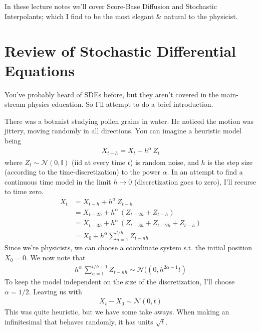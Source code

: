 \\
\\
In these lecture notes we'll cover Score-Base Diffusion and Stochastic Interpolants; which I find to be the most elegant \& natural to the physicist.



\section{Review of Stochastic Differential Equations}
You've probably heard of SDEs before, but they aren't covered in the main-stream physics education. So I'll attempt to do a brief introduction. 

There was a botanist studying pollen grains in water. He noticed the motion was jittery, moving randomly in all directions. You can imagine a heuristic model being
\begin{align}
	X_{t+h} = X_t + h^\alpha \, Z_t
\end{align}
where $Z_t \sim \mathcal N(0, \mathbb I)$ (iid at every time $t$) is random noise, and $h$ is the step size (according to the time-discretization) to the power $\alpha$. In an attempt to find a continuous time model in the limit $h \to 0$ (discretization goes to zero), I'll recurse to time zero.
\begin{align}
	X_{t} &= X_{t-h} + h^\alpha \, Z_{t-h}\\
	& = X_{t-2h} + h^\alpha \, (Z_{t-2h} + Z_{t-h})\\
	& = X_{t-3h} + h^\alpha \, (Z_{t-3h} + Z_{t-2h} + Z_{t-h})\\
	& = X_0 + h^\alpha \sum_{n=1}^{t/h } Z_{t - nh}
\end{align}
Since we're physicists, we can choose a coordinate system s.t. the initial position $X_0 = 0$. We now note that
\begin{align}
	h^\alpha \, \sum_{n=1}^{t/h  + 1} Z_{t - nh} \sim   \mathcal N(\left(0, h^{2\alpha - 1} t \right)
\end{align}
To keep the model independent on the size of the discretization, I'll choose $\alpha = 1/2$. Leaving us with
\begin{align}
	X_t - X_0 \sim \mathcal N(0, t)
\end{align}
This was quite heuristic, but we have some take aways. When making an infinitesimal that behaves randomly, it has units $\sqrt{t}$.

